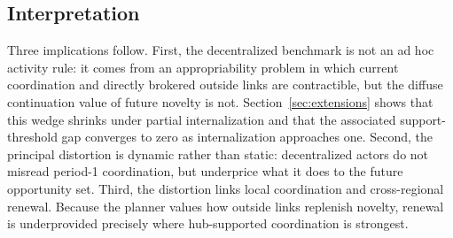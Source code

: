 \subsection{Interpretation}

Three implications follow. First, the decentralized benchmark is not an ad hoc activity rule: it comes from an appropriability problem in which current coordination and directly brokered outside links are contractible, but the diffuse continuation value of future novelty is not. Section~\ref{sec:extensions} shows that this wedge shrinks under partial internalization and that the associated support-threshold gap converges to zero as internalization approaches one. Second, the principal distortion is dynamic rather than static: decentralized actors do not misread period-1 coordination, but underprice what it does to the future opportunity set. Third, the distortion links local coordination and cross-regional renewal. Because the planner values how outside links replenish novelty, renewal is underprovided precisely where hub-supported coordination is strongest.
